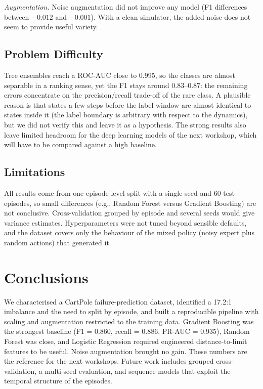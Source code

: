 \documentclass[conference]{IEEEtran}
\begin{document}
\emph{Augmentation.} Noise augmentation did not improve any model (F1 differences between
$-0.012$ and $-0.001$). With a clean simulator, the added noise does not seem to provide
useful variety.

\subsection{Problem Difficulty}
Tree ensembles reach a ROC-AUC close to 0.995, so the classes are almost separable in a
ranking sense, yet the F1 stays around 0.83--0.87: the remaining errors concentrate on the
precision/recall trade-off of the rare class. A plausible reason is that states a few steps
before the label window are almost identical to states inside it (the label boundary is
arbitrary with respect to the dynamics), but we did not verify this and leave it as a
hypothesis. The strong results also leave limited headroom for the deep learning models of
the next workshop, which will have to be compared against a high baseline.

\subsection{Limitations}
All results come from one episode-level split with a single seed and 60 test episodes, so
small differences (e.g., Random Forest versus Gradient Boosting) are not conclusive.
Cross-validation grouped by episode and several seeds would give variance estimates.
Hyperparameters were not tuned beyond sensible defaults, and the dataset covers only the
behaviour of the mixed policy (noisy expert plus random actions) that generated it.

\section{Conclusions}
We characterised a CartPole failure-prediction dataset, identified a 17.2:1 imbalance and
the need to split by episode, and built a reproducible pipeline with scaling and
augmentation restricted to the training data. Gradient Boosting was the strongest baseline
(F1 = 0.860, recall = 0.886, PR-AUC = 0.935), Random Forest was close, and Logistic
Regression required engineered distance-to-limit features to be useful. Noise augmentation
brought no gain. These numbers are the reference for the next workshops. Future work
includes grouped cross-validation, a multi-seed evaluation, and sequence models that
exploit the temporal structure of the episodes.
\end{document}
